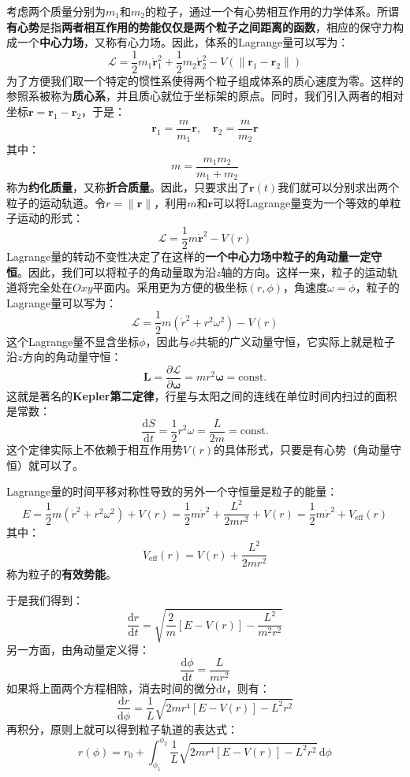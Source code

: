\documentclass[a4paper,openany]{book}
\begin{document}
考虑两个质量分别为$m_1$和$m_2$的粒子，通过一个有心势相互作用的力学体系。所谓\textbf{有心势}是指\textbf{两者相互作用的势能仅仅是两个粒子之间距离的函数}，相应的保守力构成一个\textbf{中心力场}，又称有心力场。因此，体系的Lagrange量可以写为：
\[
    \mathcal{L} = \frac{1}{2}m_1\bm{\dot{r}}_1^2 + \frac{1}{2}m_2\bm{\dot{r}}_2^2 - V(\|\bm{r}_1 - \bm{r}_2\|)
\]
为了方便我们取一个特定的惯性系使得两个粒子组成体系的质心速度为零。这样的参照系被称为\textbf{质心系}，并且质心就位于坐标架的原点。同时，我们引入两者的相对坐标$\bm{r} = \bm{r}_1 - \bm{r}_2$，于是：
\[
    \bm{r}_1 = \frac{m}{m_1}\bm{r},\quad \bm{r}_2 = \frac{m}{m_2}\bm{r}
\]
其中：
\[
    \boxed{m = \dfrac{m_1 m_2}{m_1 + m_2}}
\]
称为\textbf{约化质量}，又称\textbf{折合质量}。因此，只要求出了$\bm{r}(t)$我们就可以分别求出两个粒子的运动轨道。令$r = \|\bm{r}\|$，利用$m$和$\bm{r}$可以将Lagrange量变为一个等效的单粒子运动的形式：
\[
    \mathcal{L} = \frac{1}{2}m\bm{\dot{r}}^2 - V(r)
\]
Lagrange量的转动不变性决定了在这样的\textbf{一个中心力场中粒子的角动量一定守恒}。因此，我们可以将粒子的角动量取为沿$z$轴的方向。这样一来，粒子的运动轨道将完全处在$Oxy$平面内。采用更为方便的极坐标$(r,\phi)$，角速度$\omega = \dot{\phi}$，粒子的Lagrange量可以写为：
\[
    \mathcal{L} = \frac{1}{2}m\left(\dot{r}^2 + r^2\omega^2\right) - V(r)
\]
这个Lagrange量不显含坐标$\phi$，因此与$\phi$共轭的广义动量守恒，它实际上就是粒子沿$z$方向的角动量守恒：
\[
    \bm{L} = \frac{\partial \mathcal{L}}{\partial \bm{\omega}} = mr^2 \bm{\omega} = \mathrm{const.}
\]
这就是著名的\textbf{Kepler第二定律}，行星与太阳之间的连线在单位时间内扫过的面积是常数：
\[
    \boxed{\frac{\mathrm{d}S}{\mathrm{d}t} = \frac{1}{2}r^2 \omega = \frac{L}{2m} = \mathrm{const.}}
\]
这个定律实际上不依赖于相互作用势$V(r)$的具体形式，只要是有心势（角动量守恒）就可以了。

Lagrange量的时间平移对称性导致的另外一个守恒量是粒子的能量：
\[
    E
    = \frac{1}{2}m\left(\dot{r}^2 + r^2\omega^2\right) + V(r)
    = \frac{1}{2}m\dot{r}^2 + \frac{L^2}{2mr^2} + V(r)
    = \frac{1}{2}m\dot{r}^2 + V_{\mathrm{eff}}(r)
\]
其中：
\[
    \boxed{V_{\mathrm{eff}}(r) = V(r) + \frac{L^2}{2mr^2}}
\]
称为粒子的\textbf{有效势能}。

于是我们得到：
\[
    \frac{\mathrm{d}r}{\mathrm{d}t} = \sqrt{\frac{2}{m}\left[E-V(r)\right] - \frac{L^2}{m^2 r^2}}
\]
另一方面，由角动量定义得：
\[
    \dfrac{\mathrm{d}\phi}{\mathrm{d}t} = \dfrac{L}{mr^2}
\]
如果将上面两个方程相除，消去时间的微分$\mathrm{d}t$，则有：
\[
    \frac{\mathrm{d}r}{\mathrm{d}\phi} = \frac{1}{L}\sqrt{2mr^4[E-V(r)] - L^2 r^2}
\]
再积分，原则上就可以得到粒子轨道的表达式：
\[
    r(\phi) = r_0 + \int_{\phi_1}^{\phi_2} \frac{1}{L}\sqrt{2mr^4[E-V(r)] - L^2 r^2}\,\mathrm{d}\phi
\]
\end{document}
